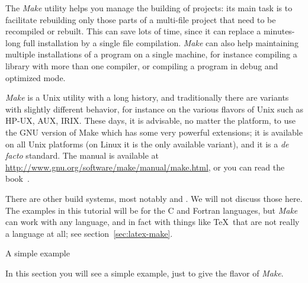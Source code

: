 
\lstset{language=bash}

The \emph{Make} utility helps you manage the building of
projects: its main task is to facilitate rebuilding only those parts 
of a multi-file project that need to be recompiled or rebuilt.
This can save lots of time, since it
can replace a minutes-long full installation by a single file
compilation. \emph{Make} can also help maintaining multiple
installations of a program on a single machine, for instance compiling
a library with more than one compiler, or compiling a program in debug
and optimized mode.

\emph{Make} is a Unix utility with a long history, and traditionally
there are variants with slightly different behavior, 
for instance on the various
flavors of Unix such as HP-UX, AUX, IRIX. 
These days, it is advisable, no
matter the platform, to use the GNU version of Make which has some
very powerful extensions; it is available on all Unix platforms
(on Linux it is the only available variant), and it is a {\it de
  facto} standard. The manual is available at
\url{http://www.gnu.org/software/make/manual/make.html}, or you can
read the book~\cite{OReilly-GnuMake}.

There are other build systems, most notably  and
. We will not discuss those here. The examples in this
tutorial will be for the C and Fortran languages, but \emph{Make} can
work with any language, and in fact with things like \TeX\ that are
not really a language at all; see section~\ref{sec:latex-make}.

 {A simple example}

\begin{purpose}
In this section you will see a simple example, just to give the flavor of
\emph{Make}.
\end{purpose}

